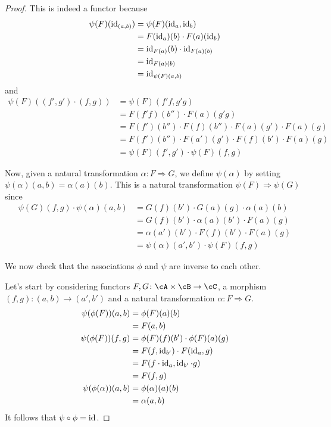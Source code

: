 \documentclass[a4paper,11pt,openany]{scrartcl}
\begin{document}
\begin{proof}
    This is indeed a functor because
    \begin{align*}
        \psi(F)(\operatorname{id}_{(a,b)}) &=\psi(F)(\operatorname{id}_a,\operatorname{id}_b) \\
        &=F(\operatorname{id}_a)(b)\cdot F(a)(\operatorname{id}_b) \\
        &=\operatorname{id}_{F(a)}(b)\cdot\operatorname{id}_{F(a)(b)} \\
        &=\operatorname{id}_{F(a)(b)} \\
        &=\operatorname{id}_{\psi(F)(a,b)}
    \end{align*}
    and
    \begin{align*}
        \psi(F)((f',g')\cdot(f,g)) &=\psi(F)(f'f,g'g) \\
        &=F(f'f)(b'')\cdot F(a)(g'g) \\
        &=F(f')(b'')\cdot F(f)(b'')\cdot F(a)(g')\cdot F(a)(g) \\
        &=F(f')(b'')\cdot F(a')(g')\cdot F(f)(b')\cdot F(a)(g) \\
        &=\psi(F)(f',g')\cdot\psi(F)(f,g)
    \end{align*}

    Now, given a natural transformation $\alpha\colon F\Rightarrow G$, we define
    $\psi(\alpha)$ by setting $\psi(\alpha)(a,b)=\alpha(a)(b)$. This is a
    natural transformation $\psi(F)\Rightarrow\psi(G)$ since
    \begin{align*}
        \psi(G)(f,g)\cdot\psi(\alpha)(a,b) &=G(f)(b')\cdot
        G(a)(g)\cdot\alpha(a)(b) \\
        &=G(f)(b')\cdot\alpha(a)(b')\cdot F(a)(g) \\
        &=\alpha(a')(b')\cdot F(f)(b')\cdot F(a)(g) \\
        &=\psi(\alpha)(a',b')\cdot\psi(F)(f,g)
    \end{align*}

    We now check that the associations $\phi$ and $\psi$ are inverse to each
    other.

    Let's start by considering functors $F,G\colon\cA\times\cB\rightarrow\cC$,
    a morphism $(f,g)\colon(a,b)\rightarrow(a',b')$ and a natural transformation
    $\alpha\colon F\Rightarrow G$.
    \begin{align*}
        \psi(\phi(F))(a,b) &=\phi(F)(a)(b) \\
        &=F(a,b) \\
        \psi(\phi(F))(f,g) &=\phi(F)(f)(b')\cdot\phi(F)(a)(g) \\
        &=F(f,\operatorname{id}_{b'})\cdot F(\operatorname{id}_a,g) \\
        &=F(f\cdot\operatorname{id}_a,\operatorname{id}_{b'}\cdot g) \\
        &=F(f,g) \\
        \psi(\phi(\alpha))(a,b) &=\phi(\alpha)(a)(b) \\
        &=\alpha(a,b)
    \end{align*}
    It follows that $\psi\circ\phi=\operatorname{id}$.


\end{proof}
\end{document}
